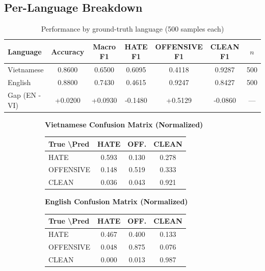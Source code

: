 \documentclass[11pt,a4paper]{article}
\begin{document}
\subsection{Per-Language Breakdown}

\begin{table}[H]
\centering
\caption{Performance by ground-truth language (500 samples each)}
\label{tab:per_lang}
\begin{tabular}{lcccccc}
\toprule
Language & Accuracy & Macro F1 & HATE F1 & OFFENSIVE F1 & CLEAN F1 & $n$ \\
\midrule
Vietnamese & 0.8600 & 0.6500 & 0.6095 & 0.4118 & 0.9287 & 500 \\
English    & 0.8800 & 0.7430 & 0.4615 & 0.9247 & 0.8427 & 500 \\
\midrule
Gap (EN - VI) & +0.0200 & +0.0930 & -0.1480 & +0.5129 & -0.0860 & --- \\
\bottomrule
\end{tabular}
\end{table}

\begin{figure}[H]
\centering
\begin{subfigure}{0.48\textwidth}
\centering
\textbf{Vietnamese Confusion Matrix (Normalized)}\\
\begin{tabular}{lccc}
\toprule
True \textbackslash Pred & HATE & OFF. & CLEAN \\
\midrule
HATE       & 0.593 & 0.130 & 0.278 \\
OFFENSIVE  & 0.148 & 0.519 & 0.333 \\
CLEAN      & 0.036 & 0.043 & 0.921 \\
\bottomrule
\end{tabular}
\end{subfigure}\hfill
\begin{subfigure}{0.48\textwidth}
\centering
\textbf{English Confusion Matrix (Normalized)}\\
\begin{tabular}{lccc}
\toprule
True \textbackslash Pred & HATE & OFF. & CLEAN \\
\midrule
HATE       & 0.467 & 0.400 & 0.133 \\
OFFENSIVE  & 0.048 & 0.875 & 0.076 \\
CLEAN      & 0.000 & 0.013 & 0.987 \\
\bottomrule
\end{tabular}
\end{subfigure}
\end{figure}
\end{document}
